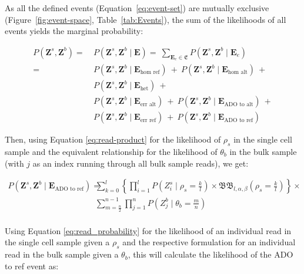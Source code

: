 \documentclass[authoryear,preprint,11pt]{scrartcl}
\newcommand{\Prob}{{P}}
\newcommand{\cB}{{\mathfrak B}}
\begin{document}
As all the defined events (Equation~\ref{eq:event-set}) are mutually exclusive (Figure~\ref{fig:event-space}, Table~\ref{tab:Events}), the sum of the likelihoods of all events yields the marginal probability:

\begin{equation}
  \label{eq:marginal-prob}
  \begin{split}
    \Prob(\boldsymbol{Z}^s,\boldsymbol{Z}^b)
      =~&\Prob(\boldsymbol{Z}^s,\boldsymbol{Z}^b \mid \boldsymbol{E})     =~\sum_{\boldsymbol{E}_e \in \mathfrak{E}}{\Prob(\boldsymbol{Z}^s,\boldsymbol{Z}^b \mid \boldsymbol{E}_e)}\\
      =~&\Prob(\boldsymbol{Z}^s,\boldsymbol{Z}^b \mid \boldsymbol{E}_{\text{hom ref}})~+~ \Prob(\boldsymbol{Z}^s,\boldsymbol{Z}^b \mid \boldsymbol{E}_{\text{hom alt}})~+\\
        &\Prob(\boldsymbol{Z}^s,\boldsymbol{Z}^b \mid \boldsymbol{E}_{\text{het}})~+\\
        &\Prob(\boldsymbol{Z}^s,\boldsymbol{Z}^b \mid \boldsymbol{E}_{\text{err alt}})~+~ \Prob(\boldsymbol{Z}^s,\boldsymbol{Z}^b \mid \boldsymbol{E}_{\text{ADO to alt}})~+\\
        &\Prob(\boldsymbol{Z}^s,\boldsymbol{Z}^b \mid \boldsymbol{E}_{\text{err ref}})~+~ \Prob(\boldsymbol{Z}^s,\boldsymbol{Z}^b \mid \boldsymbol{E}_{\text{ADO to ref}})
  \end{split}
\end{equation}

Then, using Equation \ref{eq:read-product} for the likelihood of $\rho_s$ in the single cell sample and the equivalent relationship for the likelihood of $\theta_b$ in the bulk sample (with $j$ as an index running through all bulk sample reads), we get:

\begin{equation}
  \label{eq:ado-to-ref-likelihood-reads}
  \begin{split}
    \Prob(\boldsymbol{Z}^s,\boldsymbol{Z}^b \mid \boldsymbol{E}_{\text{ADO to ref}})
      =~&\sum_{k=0}^{l} \left\{ \prod_{i=1}^{l} \Prob(Z_i^s \mid \rho_s = \frac{k}{l}) \times \cB\cB_{l,\alpha, \beta} (\rho_s = \frac{k}{l}) \right\} \times\\
        &\sum_{m=\frac{n}{2}}^{n-1} \prod_{j=1}^{n} \Prob(Z_j^b \mid \theta_b = \frac{m}{n})\\
  \end{split}    
\end{equation}

Using Equation \ref{eq:read_probability} for the likelihood of an individual read in the single cell sample given a $\rho_s$ and the respective formulation for an individual read in the bulk sample given a $\theta_b$, this will calculate the likelihood of the {\ttfamily ADO to ref} event as:
\end{document}
